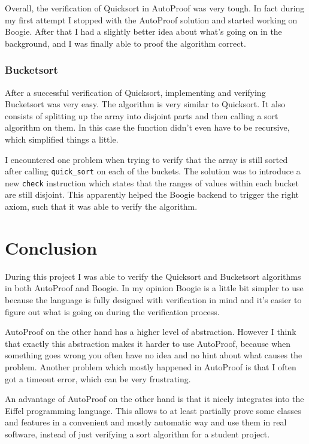 \documentclass[a4paper,10pt]{article}
\begin{document}
Overall, the verification of Quicksort in AutoProof was very tough.
In fact during my first attempt I stopped with the AutoProof solution and started working on Boogie.
After that I had a slightly better idea about what's going on in the background, and I was finally able to proof the algorithm correct.

\subsubsection{Bucketsort}

After a successful verification of Quicksort, implementing and verifying Bucketsort was very easy.
The algorithm is very similar to Quicksort.
It also consists of splitting up the array into disjoint parts and then calling a sort algorithm on them.
In this case the function didn't even have to be recursive, which simplified things a little.

I encountered one problem when trying to verify that the array is still sorted after calling \lstinline!quick_sort! on each of the buckets.
The solution was to introduce a new \lstinline!check! instruction which states that the ranges of values within each bucket are still disjoint.
This apparently helped the Boogie backend to trigger the right axiom, such that it was able to verify the algorithm.

\section {Conclusion}

During this project I was able to verify the Quicksort and Bucketsort algorithms in both AutoProof and Boogie.
In my opinion Boogie is a little bit simpler to use because the language is fully designed with verification in mind
and it's easier to figure out what is going on during the verification process.

AutoProof on the other hand has a higher level of abstraction.
However I think that exactly this abstraction makes it harder to use AutoProof, 
because when something goes wrong you often have no idea and no hint about what causes the problem.
Another problem which mostly happened in AutoProof is that I often got a timeout error, which can be very frustrating.

An advantage of AutoProof on the other hand is that it nicely integrates into the Eiffel programming language.
This allows to at least partially prove some classes and features in a convenient and mostly automatic way
and use them in real software, instead of just verifying a sort algorithm for a student project.
\end{document}
